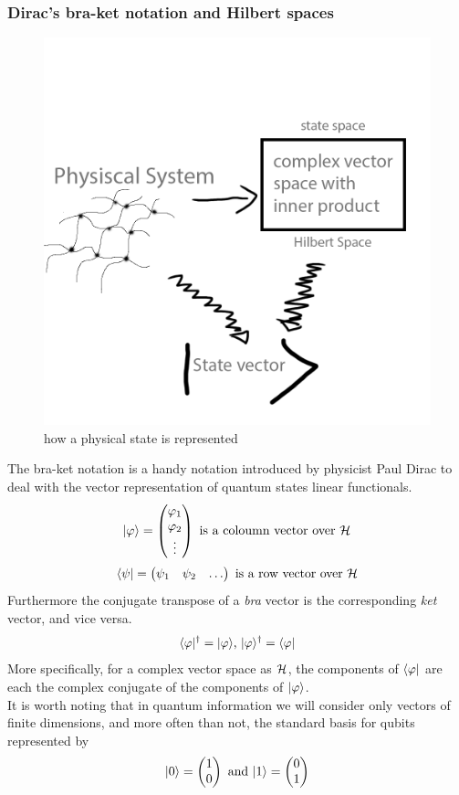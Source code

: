 	\subsubsection*{Dirac's bra-ket notation and Hilbert spaces}
	\begin{figure}[h!]
		\centering
		\includegraphics[scale=0.2]{images/sketch1.png} 
		\caption{how a physical state is represented}
	\end{figure}
	The bra-ket notation is a handy notation introduced by physicist Paul Dirac to deal with the vector representation of quantum states linear functionals. 
	$$|\varphi \rangle = \begin{pmatrix} \varphi_1 \\ \varphi_2 \\ \vdots \end{pmatrix}	  \text{  is a coloumn vector over } \mathcal{H} $$
	$$\langle \psi|  = \begin{pmatrix} \psi_1 & \psi_2 & \hdots \end{pmatrix} \text{  is a row vector over } \mathcal{H} $$
	Furthermore the conjugate transpose of a \emph{bra} vector is the corresponding \emph{ket} vector, and vice versa.\cite{bkNot}
	$$ \langle \varphi|^{\dagger} = |\varphi \rangle \text{,    } |\varphi \rangle^{\dagger} = \langle \varphi|$$
	More specifically, for a complex vector space as $\mathcal{H}$, the components of $\langle \varphi|$ are each the complex conjugate of the components of $|\varphi \rangle$.\\
	It is worth noting that in quantum information we will consider only vectors of finite dimensions, and more often than not, the standard basis for qubits represented by
	$$|0 \rangle =  \begin{pmatrix} 1 \\ 0 \end{pmatrix}
	\text{ and }
	|1 \rangle =  \begin{pmatrix} 0 \\ 1 \end{pmatrix}$$
	

